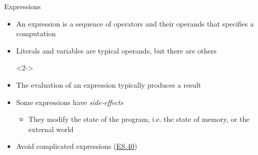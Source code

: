 \begin{frame}[fragile]{Expressions}

  \begin{itemize}
  \item An expression is a sequence of operators and their operands
    that specifies a computation
  \item Literals and variables are typical operands, but there are others

  \begin{codeblock}<2->{
}\end{codeblock}

\item<7-> The evaluation of an expression typically produces a result
\item<8-> Some expressions have \textit{side-effects}
  \begin{itemize}
  \item They modify the state of the program, i.e. the state of memory, or the
    external world
  \end{itemize}
\item<9-> Avoid complicated expressions
  (\href{https://isocpp.github.io/CppCoreGuidelines/CppCoreGuidelines#es40-avoid-complicated-expressions}{ES.40})
\end{itemize}

\end{frame}

